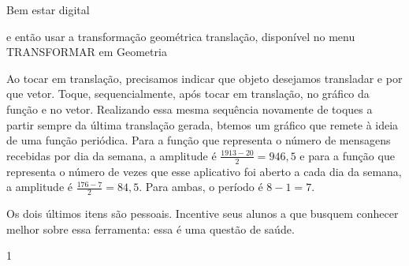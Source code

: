 \begin{answer}{Bem estar digital}
{\begin{enumerate}[left=7.5pt, wide]

	e então usar a transformação geométrica translação, disponível no menu TRANSFORMAR em Geometria


	Ao tocar em translação, precisamos indicar que objeto desejamos transladar e por que vetor. Toque, sequencialmente, após tocar em translação, no gráfico da função e no vetor. Realizando essa mesma sequência novamente de toques a partir sempre da última translação gerada, btemos um gráfico que remete à ideia de uma função periódica. Para a função que representa o número de mensagens recebidas por dia da semana, a amplitude é $\frac{1913−20}{2}= 946{,}5$ e para a função que representa o número de vezes que esse aplicativo foi aberto a cada dia da semana, a amplitude é $\frac{176−7}{2} = 84{,}5$. Para ambas, o período é $8 - 1 = 7$.

	Os dois últimos itens são pessoais. Incentive seus alunos a que busquem conhecer melhor sobre essa ferramenta: essa é uma questão de saúde.
	\end{enumerate}
}{1}
\end{answer}


